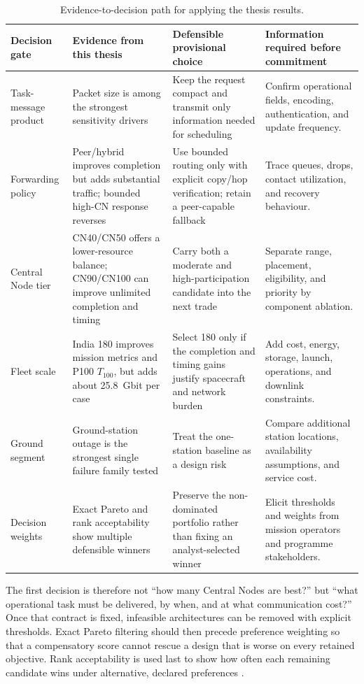 \begin{table}[htbp]
\centering
\scriptsize
\caption{Evidence-to-decision path for applying the thesis results.}
\label{tab:decision_path}
\begin{tabularx}{\textwidth}{L{0.18\textwidth}L{0.28\textwidth}L{0.23\textwidth}Y}
\toprule
Decision gate & Evidence from this thesis & Defensible provisional choice & Information required before commitment \\
\midrule
Task-message product & Packet size is among the strongest sensitivity drivers & Keep the request compact and transmit only information needed for scheduling & Confirm operational fields, encoding, authentication, and update frequency. \\
Forwarding policy & Peer/hybrid improves completion but adds substantial traffic; bounded high-CN response reverses & Use bounded routing only with explicit copy/hop verification; retain a peer-capable fallback & Trace queues, drops, contact utilization, and recovery behaviour. \\
Central Node tier & CN40/CN50 offers a lower-resource balance; CN90/CN100 can improve unlimited completion and timing & Carry both a moderate and high-participation candidate into the next trade & Separate range, placement, eligibility, and priority by component ablation. \\
Fleet scale & India 180 improves mission metrics and P100 $T_{100}$, but adds about 25.8~Gbit per case & Select 180 only if the completion and timing gains justify spacecraft and network burden & Add cost, energy, storage, launch, operations, and downlink constraints. \\
Ground segment & Ground-station outage is the strongest single failure family tested & Treat the one-station baseline as a design risk & Compare additional station locations, availability assumptions, and service cost. \\
Decision weights & Exact Pareto and rank acceptability show multiple defensible winners & Preserve the non-dominated portfolio rather than fixing an analyst-selected winner & Elicit thresholds and weights from mission operators and programme stakeholders. \\
\bottomrule
\end{tabularx}
\end{table}

The first decision is therefore not ``how many Central Nodes are best?'' but ``what operational task must be delivered, by when, and at what communication cost?'' Once that contract is fixed, infeasible architectures can be removed with explicit thresholds. Exact Pareto filtering should then precede preference weighting so that a compensatory score cannot rescue a design that is worse on every retained objective. Rank acceptability is used last to show how often each remaining candidate wins under alternative, declared preferences \citep{LahdelmaSalminen2001}.

